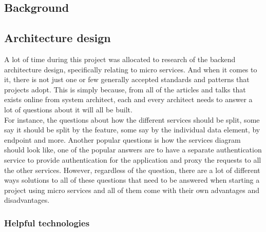 \documentclass{article}
\newcommand{\vspaceconst}{-2ex}
\begin{document}
\begin{multicols}{2}
\section{Background}
\vspace{\vspaceconst}

\subsection{Architecture design}
\vspace{\vspaceconst}

A lot of time during this project was allocated to research of the backend architecture design, specifically relating to micro services. And when it comes to it, there is not just one or few generally accepted standards and patterns that projects adopt. This is simply because, from all of the articles and talks that exists online from system architect, each and every architect needs to answer a lot of questions about it will all be built.\\
 For instance, the questions about how the different services should be split, some say it should be split by the feature, some say by the individual data element, by endpoint and more. Another popular questions is how the services diagram should look like, one of the popular answers are to have a separate authentication service to provide authentication for the application and proxy the requests to all the other services. However, regardless of the question, there are a lot of different ways solutions to all of these questions that need to be answered when starting a project using micro services and all of them come with their own advantages and disadvantages.\\

\subsubsection{Helpful technologies}
\vspace{\vspaceconst}


\end{multicols}
\end{document}
